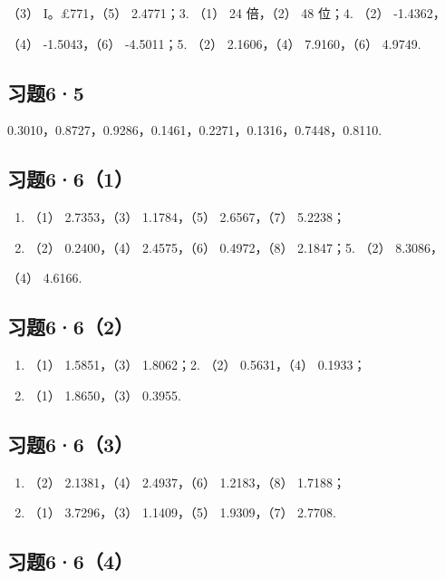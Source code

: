 （3） I。£771，（5） 2.4771；3. （1） 24 倍，（2） 48 位；4. （2）
-1.4362，

（4） -1.5043，（6） -4.5011；5. （2） 2.1606，（4） 7.9160，（6）
4.9749.

\subsection{习题6·5}

0.3010，0.8727，0.9286，0.1461，0.2271，0.1316，0.7448，0.8110.

\subsection{习题6·6（1）}

\begin{enumerate}[start=3]
\item
  （1） 2.7353，（3） 1.1784，（5） 2.6567，（7） 5.2238；
\item
  （2） 0.2400，（4） 2.4575，（6） 0.4972，（8） 2.1847；5. （2）
  8.3086，
\end{enumerate}

（4） 4.6166.

\subsection{习题6·6（2）}

\begin{enumerate}
\item
  （1） 1.5851，（3） 1.8062；2. （2） 0.5631，（4） 0.1933；
\item
  （1） 1.8650，（3） 0.3955.
\end{enumerate}

\subsection{习题6·6（3）}

\begin{enumerate}
\item
  （2） 2.1381，（4） 2.4937，（6） 1.2183，（8） 1.7188；
\item
  （1） 3.7296，（3） 1.1409，（5） 1.9309，（7） 2.7708.
\end{enumerate}

\subsection{习题6·6（4）}


